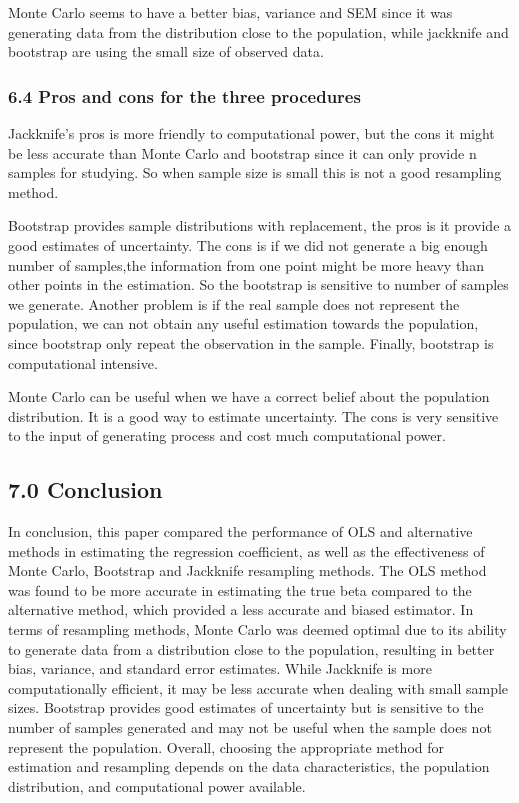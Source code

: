 \documentclass[
]{article}
\begin{document}
Monte Carlo seems to have a better bias, variance and SEM since it was
generating data from the distribution close to the population, while
jackknife and bootstrap are using the small size of observed data.

\hypertarget{pros-and-cons-for-the-three-procedures}{%
\subsubsection{6.4 Pros and cons for the three
procedures}\label{pros-and-cons-for-the-three-procedures}}

Jackknife's pros is more friendly to computational power, but the cons
it might be less accurate than Monte Carlo and bootstrap since it can
only provide n samples for studying. So when sample size is small this
is not a good resampling method.

Bootstrap provides sample distributions with replacement, the pros is it
provide a good estimates of uncertainty. The cons is if we did not
generate a big enough number of samples,the information from one point
might be more heavy than other points in the estimation. So the
bootstrap is sensitive to number of samples we generate. Another problem
is if the real sample does not represent the population, we can not
obtain any useful estimation towards the population, since bootstrap
only repeat the observation in the sample. Finally, bootstrap is
computational intensive.

Monte Carlo can be useful when we have a correct belief about the
population distribution. It is a good way to estimate uncertainty. The
cons is very sensitive to the input of generating process and cost much
computational power.

\hypertarget{conclusion}{%
\subsection{7.0 Conclusion}\label{conclusion}}

In conclusion, this paper compared the performance of OLS and
alternative methods in estimating the regression coefficient, as well as
the effectiveness of Monte Carlo, Bootstrap and Jackknife resampling
methods. The OLS method was found to be more accurate in estimating the
true beta compared to the alternative method, which provided a less
accurate and biased estimator. In terms of resampling methods, Monte
Carlo was deemed optimal due to its ability to generate data from a
distribution close to the population, resulting in better bias,
variance, and standard error estimates. While Jackknife is more
computationally efficient, it may be less accurate when dealing with
small sample sizes. Bootstrap provides good estimates of uncertainty but
is sensitive to the number of samples generated and may not be useful
when the sample does not represent the population. Overall, choosing the
appropriate method for estimation and resampling depends on the data
characteristics, the population distribution, and computational power
available.
\end{document}
